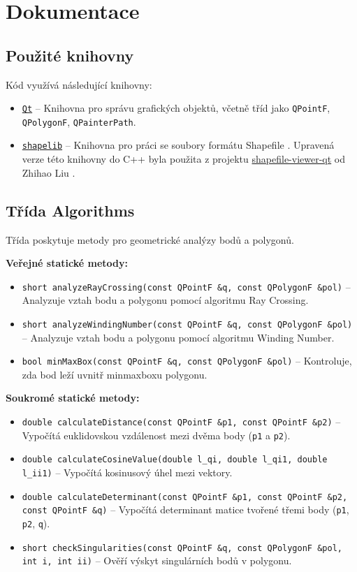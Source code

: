 \newpage
\section{Dokumentace}

\subsection{Použité knihovny}
Kód využívá následující knihovny:
\begin{itemize}
\item \texttt{\href{https://www.qt.io/}{Qt}} – Knihovna pro správu grafických objektů, včetně tříd jako \texttt{QPointF}, \texttt{QPolygonF}, \texttt{QPainterPath}.
\item \texttt{\href{http://shapelib.maptools.org/}{shapelib}} – Knihovna pro práci se soubory formátu Shapefile \cite{shapelib}. Upravená verze této knihovny do C++ byla použita z projektu \href{https://github.com/zhihao-liu/shapefile-viewer-qt/tree/master/shapelib}{shapefile-viewer-qt} od Zhihao Liu \cite{liu2025shapelib}.
\end{itemize}

\subsection{Třída Algorithms}
Třída poskytuje metody pro geometrické analýzy bodů a polygonů.

\textbf{Veřejné statické metody:}
\begin{itemize}
\item \texttt{short analyzeRayCrossing(const QPointF \&q, const QPolygonF \&pol)} – Analyzuje vztah bodu a polygonu pomocí algoritmu Ray Crossing.
\item \texttt{short analyzeWindingNumber(const QPointF \&q, const QPolygonF \&pol)} – Analyzuje vztah bodu a polygonu pomocí algoritmu Winding Number.
\item \texttt{bool minMaxBox(const QPointF \&q, const QPolygonF \&pol)} – Kontroluje, zda bod leží uvnitř minmaxboxu polygonu.
\end{itemize}

\textbf{Soukromé statické metody:}
\begin{itemize}
\item \texttt{double calculateDistance(const QPointF \&p1, const QPointF \&p2)} – Vypočítá euklidovskou vzdálenost mezi dvěma body (\texttt{p1} a \texttt{p2}).
\item \texttt{double calculateCosineValue(double l\_qi, double l\_qi1, double l\_ii1)} – Vypočítá kosinusový úhel mezi vektory.
\item \texttt{double calculateDeterminant(const QPointF \&p1, const QPointF \&p2, const QPointF \&q)} – Vypočítá determinant matice tvořené třemi body (\texttt{p1}, \texttt{p2}, \texttt{q}).
\item \texttt{short checkSingularities(const QPointF \&q, const QPolygonF \&pol, int i, int ii)} – Ověří výskyt singulárních bodů v polygonu.
\end{itemize}

